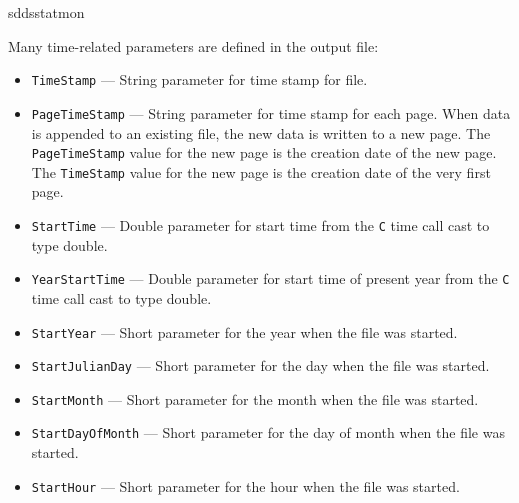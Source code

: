 \begin{sddsprog}{sddsstatmon}
\begin{itemize}
Many time-related parameters are defined in the output file:
  \begin{itemize}
    \item {\tt TimeStamp} --- String parameter for time stamp for file.
    \item {\tt PageTimeStamp} --- String parameter for time stamp for each page. When data
                is appended to an existing file, the new data is written to a new
                page. The {\tt PageTimeStamp} value for the new page is the creation
                date of the new page. The {\tt TimeStamp} value for the new page is the creation
                date of the very first page.
    \item {\tt StartTime} --- Double parameter for start time from the {\tt C} time call cast to type double.
    \item {\tt YearStartTime} --- Double parameter for start time of present year from the {\tt C} time call cast to type double.
    \item {\verb+StartYear+} --- Short parameter for the year when the file was started.
    \item {\verb+StartJulianDay+} --- Short parameter for the day when the file was started.
    \item {\verb+StartMonth+} --- Short parameter for the month when the file was started.
    \item {\verb+StartDayOfMonth+} --- Short parameter for the day of month when the file was started.
    \item {\verb+StartHour+} --- Short parameter for the hour when the file was started.
  \end{itemize}
\end{itemize} %



\end{sddsprog}
